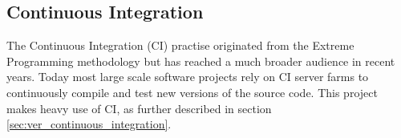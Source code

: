 
\subsection{Continuous Integration}

The Continuous Integration (CI) practise originated from the Extreme Programming methodology \cite{extreme_programming} but has reached a much broader audience in recent years. Today most large scale software projects rely on CI server farms to continuously compile and test new versions of the source code. This project makes heavy use of CI, as further described in section \ref{sec:ver_continuous_integration}.
